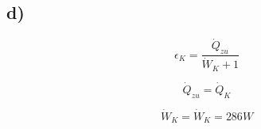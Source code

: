 

\subsection*{d)}

\[
\epsilon_K = \frac{\dot{Q}_{zu}}{\dot{W}_K + 1}
\]

\[
\dot{Q}_{zu} = \dot{Q}_K
\]

\[
\dot{W}_K = \dot{W}_K = 286W
\]